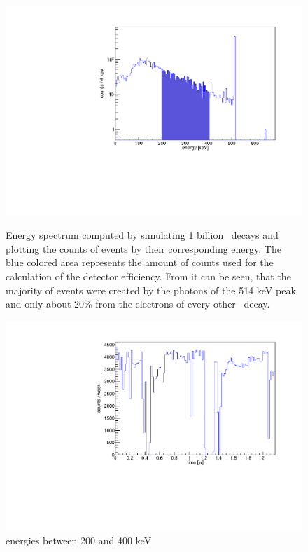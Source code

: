 \documentclass[encoding=utf8,british]{tumphthesis}
\begin{document}
\begin{figure}[t!]
	\centering
	\begin{minipage}[t]{.475\textwidth}
		\centering
		\includegraphics[width=\textwidth]{./Bilder/Sim1Phasenraum.pdf}
		\caption{
			Energy spectrum computed by simulating 1 billion \Kr\ decays and plotting the counts of events by their corresponding energy.
			The blue colored area represents the amount of counts used for the calculation of the detector efficiency.
			From it can be seen, that the majority of events were created by the photons of the 514 keV peak and only about 20$\%$ from the electrons of every other \Kr\ decay.
		}
		\label{fig:Sim1Spektrum}
	\end{minipage}\hfill%
	\begin{minipage}{.475\textwidth}
		\centering
		\includegraphics[width=\textwidth]{./Bilder/ZeitverlaufLimits.pdf}
		\caption{energies between 200 and 400 keV}
		\label{fig:ZeitLimits}
	\end{minipage}
\end{figure}
\end{document}

